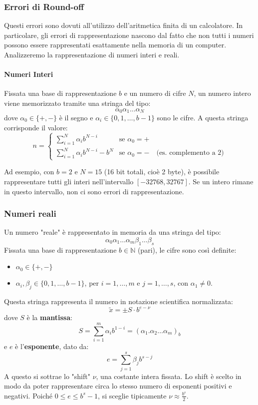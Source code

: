 \subsubsection{Errori di Round-off}
Questi errori sono dovuti all'utilizzo dell'aritmetica finita di un calcolatore. In particolare, gli errori di rappresentazione nascono dal fatto che non tutti i numeri possono essere rappresentati esattamente nella memoria di un computer.
Analizzeremo la rappresentazione di numeri interi e reali.

\paragraph{Numeri Interi}
Fissata una base di rappresentazione $b$ e un numero di cifre $N$, un numero intero viene memorizzato tramite una stringa del tipo:
$$ \alpha_0 \alpha_1 \dots \alpha_N $$
dove $\alpha_0 \in \{+,-\}$ è il segno e $\alpha_i \in \{0, 1, \dots, b-1\}$ sono le cifre. A questa stringa corrisponde il valore:
\[ n = 
\begin{cases} 
\sum_{i=1}^{N} \alpha_i b^{N-i} & \text{se } \alpha_0 = + \\
\sum_{i=1}^{N} \alpha_i b^{N-i} - b^N & \text{se } \alpha_0 = - \quad \text{(es. complemento a 2)}
\end{cases}
\]

Ad esempio, con $b=2$ e $N=15$ (16 bit totali, cioè 2 byte), è possibile rappresentare tutti gli interi nell'intervallo $[-32768, 32767]$. Se un intero rimane in questo intervallo, non ci sono errori di rappresentazione.

\subsubsection{Numeri reali}
Un numero "reale" è rappresentato in memoria da una stringa del tipo:
$$ \alpha_0 \alpha_1 \dots \alpha_m \beta_1 \dots \beta_s $$
Fissata una base di rappresentazione $b \in \mathbb{N}$ (pari), le cifre sono così definite:
\begin{itemize}
    \item $\alpha_0 \in \{+,-\}$
    \item $\alpha_i, \beta_j \in \{0, 1, \dots, b-1\}$, per $i=1,\dots,m$ e $j=1,\dots,s$, con $\alpha_1 \neq 0$.
\end{itemize}
Questa stringa rappresenta il numero in notazione scientifica normalizzata:
$$ \tilde{x} = \pm S \cdot b^{e-\nu} $$
dove $S$ è la \textbf{mantissa}:
$$ S = \sum_{i=1}^{m} \alpha_i b^{1-i} = (\alpha_1 . \alpha_2 \dots \alpha_m)_b $$
e $e$ è l'\textbf{esponente}, dato da:
$$ e = \sum_{j=1}^{s} \beta_j b^{s-j} $$
A questo si sottrae lo "shift" $\nu$, una costante intera fissata. Lo shift è scelto in modo da poter rappresentare circa lo stesso numero di esponenti positivi e negativi. Poiché $0 \le e \le b^s - 1$, si sceglie tipicamente $\nu \approx \frac{b^s}{2}$.


